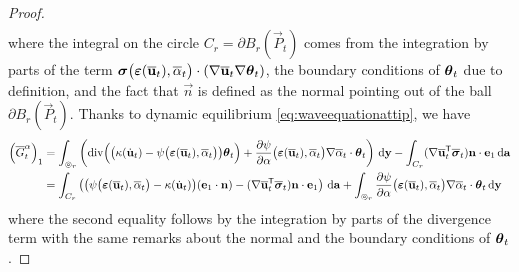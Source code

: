 \begin{proof}
\begin{multline*}
\end{multline*}
where the integral on the circle $C_r=\partial B_r(\vec{P}_t)$ comes from the integration by parts of the term $\sig\bigl(\eps(\overline{\vec{u}}_t),\overline{\alpha}_t\bigr)\cdot(\nabla\overline{\vec{u}}_t\nabla\vtheta_t)$, the boundary conditions of $\vtheta_t$ due to definition, and the fact that $\vec{n}$ is defined as the normal pointing out of the ball $\partial B_r(\vec{P}_t)$. Thanks to dynamic equilibrium \eqref{eq:waveequationattip}, we have
\begin{align*}
\left(\overline{G}^\alpha_t\right)_1 &= \int_{\circledcirc_r}\left(\div\Bigl(\bigl(\kappa(\dot{\vec{u}}_t)-\psi\bigl(\eps(\overline{\vec{u}}_t),\overline{\alpha}_t\bigr)\bigr)\vtheta_t\Bigr)+\frac{\partial\psi}{\partial\alpha}\bigl(\eps(\overline{\vec{u}}_t),\overline{\alpha}_t\bigr)\nabla\overline{\alpha}_t\cdot\vtheta_t\right)\D{\vec{y}}-\int_{C_r}(\nabla\overline{\vec{u}}_t^\mT\overline{\sig}_t)\vec{n}\cdot\vec{e}_1\D{\vec{a}} \\
&= \int_{C_r}\left(\bigl(\psi\bigl(\eps(\overline{\vec{u}}_t),\overline{\alpha}_t\bigr)-\kappa(\dot{\vec{u}}_t)\bigr)(\vec{e}_1\cdot\vec{n})-(\nabla\overline{\vec{u}}_t^\mT\overline{\sig}_t)\vec{n}\cdot\vec{e}_1\right)\D{\vec{a}}+\int_{\circledcirc_r}\frac{\partial\psi}{\partial\alpha}\bigl(\eps(\overline{\vec{u}}_t),\overline{\alpha}_t\bigr)\nabla\overline{\alpha}_t\cdot\vtheta_t\D{\vec{y}}
\end{align*}
where the second equality follows by the integration by parts of the divergence term with the same remarks about the normal and the boundary conditions of $\vtheta_t$.


\end{proof}

